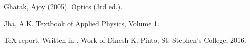 \documentclass{dkpinto-report}
\begin{document}
\begin{thebibliography}{99}
Ghatak, Ajoy (2005). Optics (3rd ed.). 

Jha, A.K. Textbook of Applied Physics, Volume 1.

\TeX-report. Written in \LaTeXe. Work of Dinesh K. Pinto, St. Stephen's College, 2016.
\end{thebibliography}
\end{document}

